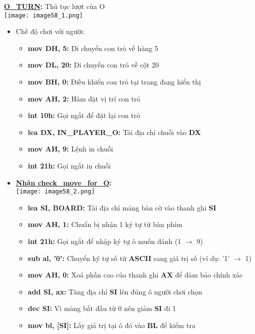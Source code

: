 
\textbf{\underline{O\_TURN}: }Thủ tục lượt của O\\
    \texttt{[image: image58\_1.png]}
\begin{itemize}
    \item Chế độ chơi với người:
    \begin{itemize}
        \item \textbf{mov DH, 5:} Di chuyển con trỏ về hàng 5
        \item \textbf{mov DL, 20:} Di chuyển con trỏ về cột 20
        \item \textbf{mov BH, 0:} Điều khiển con trỏ tại trang đang hiển thị 
        \item \textbf{mov AH, 2:} Hàm đặt vị trí con trỏ
        \item \textbf{int 10h:} Gọi ngắt để đặt lại con trỏ
        \item \textbf{lea DX, IN\_PLAYER\_O:} Tải địa chỉ chuỗi vào \textbf{DX}
        \item \textbf{mov AH, 9:} Lệnh in chuỗi
        \item \textbf{int 21h:} Gọi ngắt in chuỗi
    \end{itemize}
    \item \textbf{\underline{Nhãn check\_move\_for\_O}: }\\
    \texttt{[image: image58\_2.png]}
    \begin{itemize}
        \item \textbf{lea SI, BOARD: }Tải địa chỉ mảng bàn cờ vào thanh ghi \textbf{SI}
        \item \textbf{mov AH, 1: }Chuẩn bị nhận 1 ký tự từ bàn phím
        \item \textbf{int 21h: }Gọi ngắt để nhập ký tự ô muốn đánh (1 $\rightarrow$ 9)
        \item \textbf{sub al, '0':} Chuyển ký tự số từ \textbf{ASCII} sang giá trị số (ví dụ: '1' $\rightarrow$ 1)
        \item \textbf{mov AH, 0:} Xoá phần cao của thanh ghi \textbf{AX} để đảm bảo chính xác
        \item \textbf{add SI, ax: }Tăng địa chỉ \textbf{SI} lên đúng ô người chơi chọn
        \item \textbf{dec SI:} Vì mảng bắt đầu từ 0 nên giảm \textbf{SI} đi 1
        \item \textbf{mov bl, [SI]:} Lấy giá trị tại ô đó vào \textbf{BL} để kiểm tra

\end{itemize}
\end{itemize}
